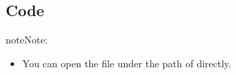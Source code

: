 \documentclass[a4paper,11pt,english]{sphinxmanual}
\begin{document}
\subsection{Code}
\label{\detokenize{Extension_Project/Greedy_Snake_Game:code}}
\begin{sphinxadmonition}{note}{Note:}\begin{itemize}
\item {} 
\sphinxAtStartPar
You can open the file  under the path of  directly.

\end{itemize}
\end{sphinxadmonition}
\end{document}
